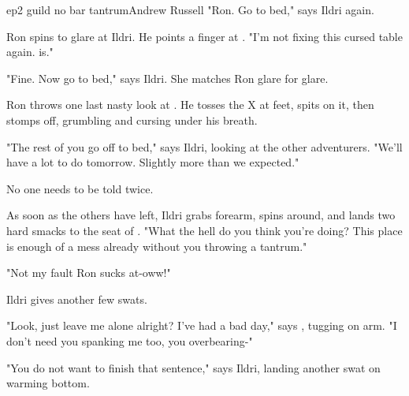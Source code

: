 \documentclass{book}
\begin{document}
\begin{childnode}{ep2 guild no bar tantrum}{Andrew Russell}
    "Ron. Go to bed," says Ildri again.

    Ron spins to glare at Ildri. He points a finger at \name{}. "I'm not fixing this cursed table again. \HeShe{} is."

    "Fine. Now go to bed," says Ildri. She matches Ron glare for glare.

    Ron throws one last nasty look at \name{}. He tosses the X at \names{} feet, spits on it, then stomps off, grumbling and cursing under his breath.

    "The rest of you go off to bed," says Ildri, looking at the other adventurers. "We'll have a lot to do tomorrow. Slightly more than we expected."

    No one needs to be told twice.

    As soon as the others have left, Ildri grabs \names{} forearm, spins \himher{} around, and lands two hard smacks to the seat of \hisher{} \trousers{}. "What the hell do you think you're doing? 
    This place is enough of a mess already without you throwing a 
    tantrum."

    "Not my fault Ron sucks at-oww!"

    Ildri gives \name{} another few swats. 

    "Look, just leave me alone alright? I've had a bad day," says \name{}, tugging on \hisher{} arm. "I don't need you spanking me too, you overbearing-"

    "You do not want to finish that sentence," says Ildri, landing another swat on \names{} warming bottom. 



\end{childnode}
\end{document}
